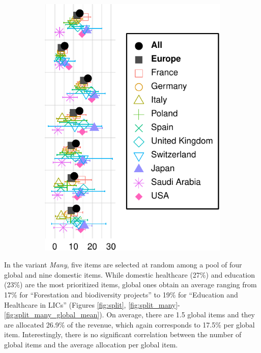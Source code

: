 \documentclass[12pt,english]{article}
\begin{document}
\begin{bibunit}
\begin{figure}[h!]
\begin{subfigure}{.38\textwidth}
    \includegraphics[height=.38\textheight]{../figures/country_comparison/split_main_nb0_nolabel.pdf}

  \end{subfigure}
\end{figure}

In the variant \textit{Many}, five items are selected at random among a pool of four global and nine domestic items. While domestic healthcare (27\%) %
and education (23\%) %
are the most prioritized items, global ones obtain an average ranging from 17\% %
for ``Forestation and biodiversity projects'' to 19\% %
for ``Education and Healthcare in LICs'' (Figures \ref{fig:split}, \ref{fig:split_many}-\ref{fig:split_many_global_mean}). On average, there are 1.5 global items and they are allocated 26.9\% of the revenue, which again corresponds to 17.5\% per global item. Interestingly, there is no significant correlation between the number of global items and the average allocation per global item. %


\end{bibunit}
\end{document}
